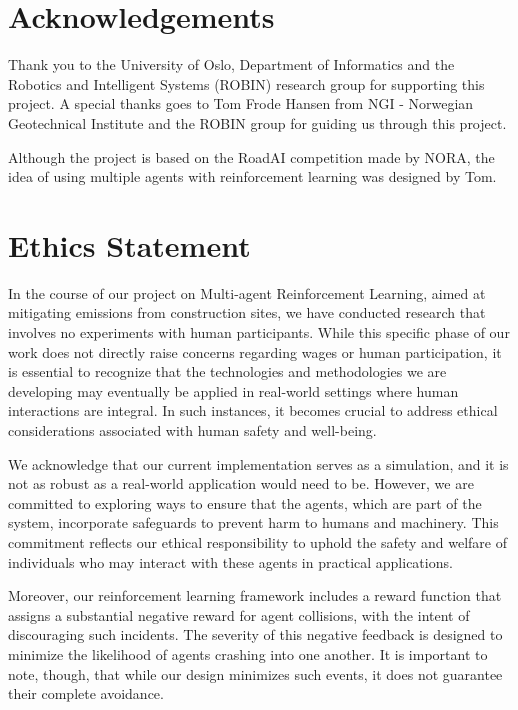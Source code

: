 \documentclass[conference]{IEEEtran}
\begin{document}
	\section{Acknowledgements}
	Thank you to the University of Oslo, Department of Informatics and the Robotics and
	Intelligent Systems (ROBIN) research group for supporting this project. A special thanks goes to
	Tom Frode Hansen from NGI - Norwegian Geotechnical Institute and the ROBIN group for guiding us through
	this project.

	Although the project is based on the RoadAI competition made by NORA, the idea of using multiple
	agents with reinforcement learning was designed by Tom.




	\section{Ethics Statement}
	In the course of our project on Multi-agent Reinforcement Learning, aimed at mitigating \coo{} emissions
	from construction sites, we have conducted research that involves no experiments with human participants.
	While this specific phase of our work does not directly raise concerns regarding wages or human
	participation, it is essential to recognize that the technologies and methodologies we are developing
	may eventually be applied in real-world settings where human interactions are integral. In such instances,
	it becomes crucial to address ethical considerations associated with human safety and well-being.

	We acknowledge that our current implementation serves as a simulation, and it is not as robust as a
	real-world application would need to be. However, we are committed to exploring ways to ensure that the
	agents, which are part of the system, incorporate safeguards to prevent harm to humans and machinery.
	This commitment reflects our ethical responsibility to uphold the safety and welfare of individuals who
	may interact with these agents in practical applications.

	Moreover, our reinforcement learning framework includes a reward function that assigns a substantial
	negative reward for agent collisions, with the intent of discouraging such incidents. The severity of
	this negative feedback is designed to minimize the likelihood of agents crashing into one another. It
	is important to note, though, that while our design minimizes such events, it does not guarantee their
	complete avoidance.
\end{document}
